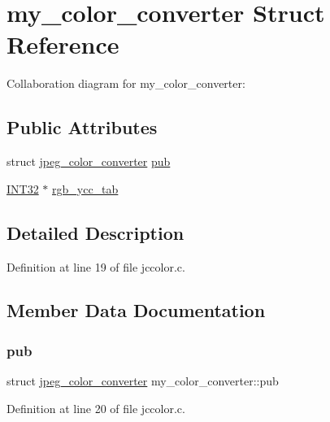 \hypertarget{structmy__color__converter}{}\section{my\+\_\+color\+\_\+converter Struct Reference}
\label{structmy__color__converter}


Collaboration diagram for my\+\_\+color\+\_\+converter\+:
\subsection*{Public Attributes}
\begin{DoxyCompactItemize}
\item 
struct \mbox{\hyperlink{structjpeg__color__converter}{jpeg\+\_\+color\+\_\+converter}} \mbox{\hyperlink{structmy__color__converter_a6dbeef88bd91b6e62d940ad245474768}{pub}}
\item 
\mbox{\hyperlink{jmorecfg_8h_a0cb58e7e6f0bad369840a52e54a56ae0}{I\+N\+T32}} $\ast$ \mbox{\hyperlink{structmy__color__converter_a783865e631ba6e4e903fcfad6625ec2f}{rgb\+\_\+ycc\+\_\+tab}}
\end{DoxyCompactItemize}


\subsection{Detailed Description}


Definition at line 19 of file jccolor.\+c.



\subsection{Member Data Documentation}
\mbox{\label{structmy__color__converter_a6dbeef88bd91b6e62d940ad245474768}} 
\subsubsection{\texorpdfstring{pub}{pub}}
{\footnotesize\ttfamily struct \mbox{\hyperlink{structjpeg__color__converter}{jpeg\+\_\+color\+\_\+converter}} my\+\_\+color\+\_\+converter\+::pub}



Definition at line 20 of file jccolor.\+c.

